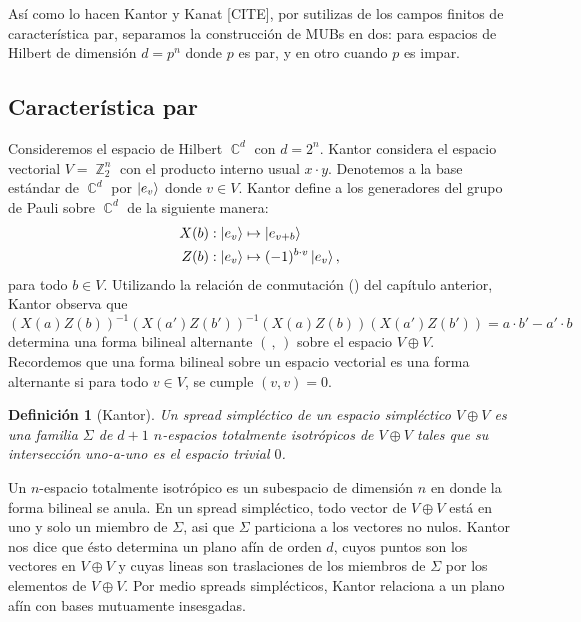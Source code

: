 \documentclass[a4paper]{report}
\DeclareMathOperator{\C}{\mathbb{C}}
\DeclareMathOperator{\Z}{\mathbb{Z}}
\newtheorem{definition}{Definición}
\begin{document}
  Así como lo hacen Kantor y Kanat [CITE], por sutilizas de
  los campos finitos de característica par, separamos la
  construcción de MUBs en dos: para espacios de Hilbert de
  dimensión $d = p^{n}$ donde $p$ es par, y en otro cuando
  $p$ es impar.

  \subsection{Característica par}

  Consideremos el espacio de Hilbert $\C^{d}$ con $d =
  2^{n}$. Kantor considera el espacio vectorial $V =
  \Z_2^{n}$ con el producto interno usual $x \cdot y$.
  Denotemos a la base estándar de $\C^{d}$ por $\ket{e_v}$ 
  donde $v \in V$. Kantor define a los generadores del grupo
  de Pauli sobre $\C^{d}$ de la siguiente manera:
  \begin{align}
    X(b) &: \ket{e_v} \mapsto \ket{e_{v+b}} \\
    Z(b) &: \ket{e_v} \mapsto (-1)^{b \cdot v} \ket{e_v},
  \end{align}
  para todo $b \in V$. Utilizando la relación de conmutación
  () del capítulo anterior, Kantor observa que
  \begin{equation}
    (X(a)Z(b))^{-1}(X(a')Z(b'))^{-1} (X(a)Z(b))(X(a')Z(b'))
    = a \cdot b' - a' \cdot b
  \end{equation}
  determina una forma bilineal alternante $(\,,\,)$ sobre el
  espacio $V \oplus V$. Recordemos que una forma bilineal
  sobre un espacio vectorial es una forma alternante si para
  todo $v \in V$, se cumple $(v,v) = 0$.
  \begin{definition}[Kantor]
    Un spread simpléctico de un espacio simpléctico $V
    \oplus V$ es una familia $\Sigma$ de $d+1$ $n$-espacios
    totalmente isotrópicos de $V \oplus V$ tales que su
    intersección uno-a-uno es el espacio trivial $0$. 
  \end{definition}
  Un $n$-espacio totalmente isotrópico es un subespacio de
  dimensión $n$ en donde la forma bilineal se anula. En un
  spread simpléctico, todo vector de $V \oplus V$ está en
  uno y solo un miembro de $\Sigma$, asi que $\Sigma$
  particiona a los vectores no nulos. Kantor nos dice que
  ésto determina un plano afín de orden $d$, cuyos puntos
  son los vectores en $V \oplus V$ y cuyas lineas son
  traslaciones de los miembros de $\Sigma$ por los elementos
  de $V \oplus V$. Por medio spreads simplécticos, Kantor
  relaciona a un plano afín con bases mutuamente insesgadas.
\end{document}
